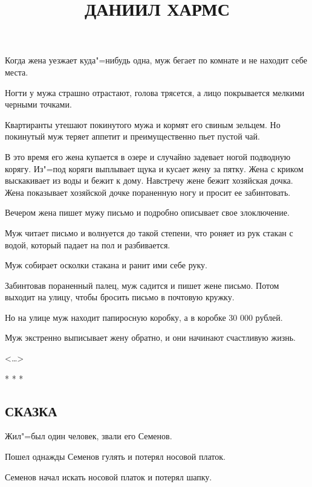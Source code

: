 \documentclass{article}
\title{\textbf{ДАНИИЛ ХАРМС}}
\date{}
\begin{document}
\maketitle{}
Когда   жена  уезжает куда"=нибудь  одна, муж бегает по комнате и не находит себе места.

Ногти у мужа страшно  отрастают,  голова трясется, а лицо покрывается мелкими черными точками.

Квартиранты  утешают покинутого  мужа  и кормят его свиным зельцем. Но  покинутый муж теряет аппетит и преимущественно пьет пустой чай.

В это время его жена купается в озере и случайно задевает ногой подводную корягу. Из"=под коряги выплывает щука и кусает жену за пятку. Жена с криком выскакивает из воды и бежит к дому. Навстречу жене бежит хозяйская дочка. Жена показывает хозяйской дочке пораненную ногу и просит ее забинтовать.

Вечером жена пишет мужу письмо и подробно описывает свое злоключение.

Муж читает письмо и волнуется  до  такой степени, что роняет из рук стакан с водой, который падает на пол и разбивается.

Муж собирает осколки стакана и ранит ими себе руку.

Забинтовав пораненный палец, муж садится и пишет жене письмо. Потом выходит на улицу, чтобы бросить письмо в почтовую кружку.

Но на улице муж находит папиросную  коробку, а в коробке 30 000 рублей.

Муж  экстренно  выписывает жену обратно, и они начинают счастливую жизнь.

\begin{flushright}<\dots>\end{flushright}

\begin{center}* * *\end{center}

\begin{center}\subsection*{\textbf{СКАЗКА}}\end{center}

Жил"=был один человек, звали его Семенов.

Пошел  однажды  Семенов гулять и потерял носовой платок.

Семенов  начал  искать  носовой платок и потерял шапку.
\end{document}
